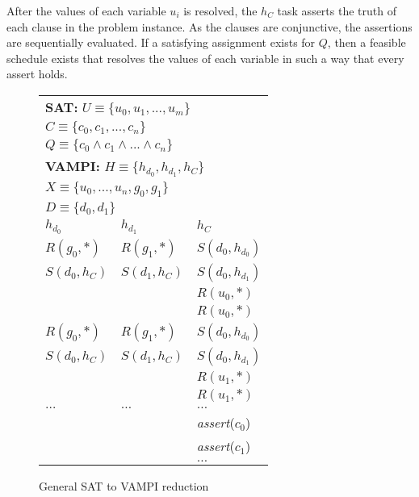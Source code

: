 After the values of each variable $u_i$ is resolved, the $h_C$ task asserts
the truth of each clause in the problem instance. As the clauses are conjunctive, the assertions
are sequentially evaluated. If a satisfying assignment exists for $Q$,
then a feasible schedule exists that resolves the values of each
variable in such a way that every assert holds.

\begin{figure}
\begin{center}
\setlength{\tabcolsep}{2pt}
\begin{tabular}[t]{|l|l|l|}
\hline
\multicolumn{3}{|l|}{\textbf{SAT:} $\mathit{U\equiv\{u_0,u_1,...,u_m\}}$}\\
              \multicolumn{3}{|l|}{$\mathit{C\equiv\{c_0,c_1,...,c_n\}}$}\\
              \multicolumn{3}{|l|}{$\mathit{Q\equiv\{c_0\wedge c_1\wedge ...\wedge c_n\}}$}\\
\hline
\multicolumn{3}{|l|}{\textbf{VAMPI:} $\mathit{H\equiv\{h_{d_0},h_{d_1},h_{C}\}}$}\\
                \multicolumn{3}{|l|}{$\mathit{X\equiv\{u_0,...,u_n,g_0,g_1\}}$}\\
                \multicolumn{3}{|l|}{$\mathit{D\equiv\{d_0,d_1\}}$}\\
\hline
$h_{d_0}$ & $h_{d_1}$ & $h_C$ \\
\hline
$R(g_{0},*)$   & $R(g_{1},*)$   & $S(d_0,h_{d_0})$ \\
$S(d_{0},h_C)$ & $S(d_{1},h_C)$ & $S(d_0,h_{d_1})$ \\
              &                & $R(u_0,*)$        \\
              &                & $R(u_0,*)$        \\
\hline
$R(g_{0},*)$  &  $R(g_{1},*)$   & $S(d_0,h_{d_0})$ \\
$S(d_{0},h_C)$&  $S(d_{1},h_C)$ & $S(d_0,h_{d_1})$ \\
              &                & $R(u_1,*)$       \\
              &                & $R(u_1,*)$       \\
\hline
$\ldots$      &  $\ldots$      & $\ldots$                \\
\hline
              &                & \textit{assert}($c_0$) \\
              &                & \textit{assert}($c_1$) \\
              &                & $\ldots$ \\
\hline
\end{tabular}
\end{center}
\caption{General SAT to VAMPI reduction}
\label{fig:vampi}
\end{figure}

